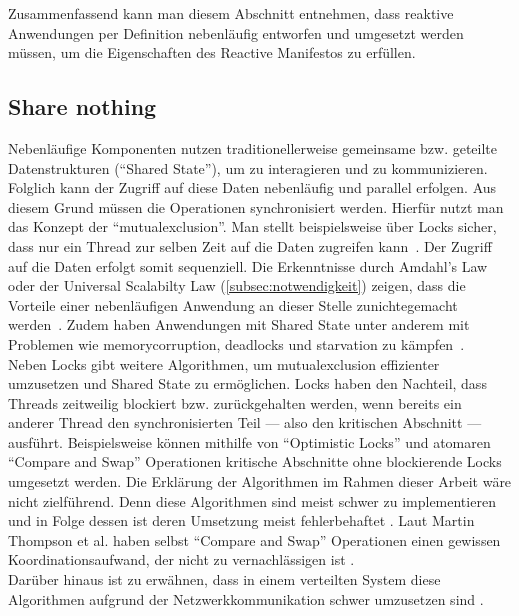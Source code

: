 Zusammenfassend kann man diesem Abschnitt entnehmen, dass reaktive Anwendungen per Definition nebenläufig entworfen und umgesetzt werden müssen, um die Eigenschaften des Reactive Manifestos zu erfüllen.

\pagebreak

\subsection{Share nothing}\label{subsec:sharenothing}
Nebenläufige Komponenten nutzen traditionellerweise gemeinsame bzw. geteilte Datenstrukturen (\enquote{Shared State}), um zu interagieren und zu kommunizieren. Folglich kann der Zugriff auf diese Daten nebenläufig und parallel erfolgen. Aus diesem Grund müssen die Operationen synchronisiert werden. Hierfür nutzt man das Konzept der \enquote{\gls{mutualexclusion}}. Man stellt beispielsweise über Locks sicher, dass nur ein Thread zur selben Zeit auf die Daten zugreifen kann~\cite[S.~10]{butcher_seven_2014}. Der Zugriff auf die Daten erfolgt somit sequenziell. Die Erkenntnisse durch Amdahl's Law oder der Universal Scalabilty Law (\ref{subsec:notwendigkeit}) zeigen, dass die Vorteile einer nebenläufigen Anwendung an dieser Stelle zunichtegemacht werden~\cite[S.~45]{kuhn_reactive_2015}. Zudem haben Anwendungen mit Shared State unter anderem mit Problemen wie \gls{memorycorruption}, \glspl{deadlock} und \gls{starvation} zu kämpfen~\cite[S.~117]{vernon_reactive_2016}.\\
Neben Locks gibt weitere Algorithmen, um \gls{mutualexclusion} effizienter umzusetzen und Shared State zu ermöglichen. Locks haben den Nachteil, dass Threads zeitweilig blockiert bzw. zurückgehalten werden, wenn bereits ein anderer Thread den synchronisierten Teil --- also den kritischen Abschnitt --- ausführt. Beispielsweise können mithilfe von \enquote{Optimistic Locks} und atomaren \enquote{Compare and Swap} Operationen kritische Abschnitte ohne blockierende Locks umgesetzt werden. Die Erklärung der Algorithmen im Rahmen dieser Arbeit wäre nicht zielführend. Denn diese Algorithmen sind meist schwer zu implementieren und in Folge dessen ist deren Umsetzung meist fehlerbehaftet \cite{jenkov_non-blocking_2015}. Laut Martin Thompson et al. haben selbst \enquote{Compare and Swap} Operationen einen gewissen Koordinationsaufwand, der nicht zu vernachlässigen ist \cite{thompson_disruptor_2011}.\\
Darüber hinaus ist zu erwähnen, dass in einem verteilten System diese Algorithmen aufgrund der Netzwerkkommunikation schwer umzusetzen sind \cite[S.~45]{butcher_seven_2014}.\\


